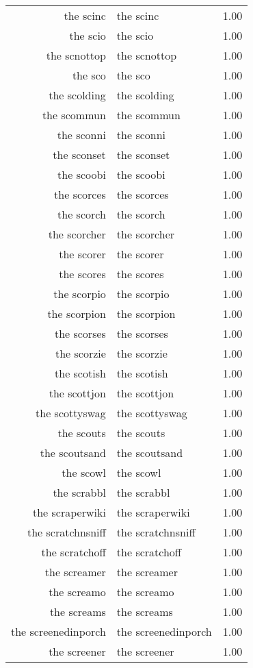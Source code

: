 \begin{table}[ht]
\begin{tabular}{rlr}
  the scinc & the scinc & 1.00 \\ 
  the scio & the scio & 1.00 \\ 
  the scnottop & the scnottop & 1.00 \\ 
  the sco & the sco & 1.00 \\ 
  the scolding & the scolding & 1.00 \\ 
  the scommun & the scommun & 1.00 \\ 
  the sconni & the sconni & 1.00 \\ 
  the sconset & the sconset & 1.00 \\ 
  the scoobi & the scoobi & 1.00 \\ 
  the scorces & the scorces & 1.00 \\ 
  the scorch & the scorch & 1.00 \\ 
  the scorcher & the scorcher & 1.00 \\ 
  the scorer & the scorer & 1.00 \\ 
  the scores & the scores & 1.00 \\ 
  the scorpio & the scorpio & 1.00 \\ 
  the scorpion & the scorpion & 1.00 \\ 
  the scorses & the scorses & 1.00 \\ 
  the scorzie & the scorzie & 1.00 \\ 
  the scotish & the scotish & 1.00 \\ 
  the scottjon & the scottjon & 1.00 \\ 
  the scottyswag & the scottyswag & 1.00 \\ 
  the scouts & the scouts & 1.00 \\ 
  the scoutsand & the scoutsand & 1.00 \\ 
  the scowl & the scowl & 1.00 \\ 
  the scrabbl & the scrabbl & 1.00 \\ 
  the scraperwiki & the scraperwiki & 1.00 \\ 
  the scratchnsniff & the scratchnsniff & 1.00 \\ 
  the scratchoff & the scratchoff & 1.00 \\ 
  the screamer & the screamer & 1.00 \\ 
  the screamo & the screamo & 1.00 \\ 
  the screams & the screams & 1.00 \\ 
  the screenedinporch & the screenedinporch & 1.00 \\ 
  the screener & the screener & 1.00 \\ 

\end{tabular}
\end{table}
